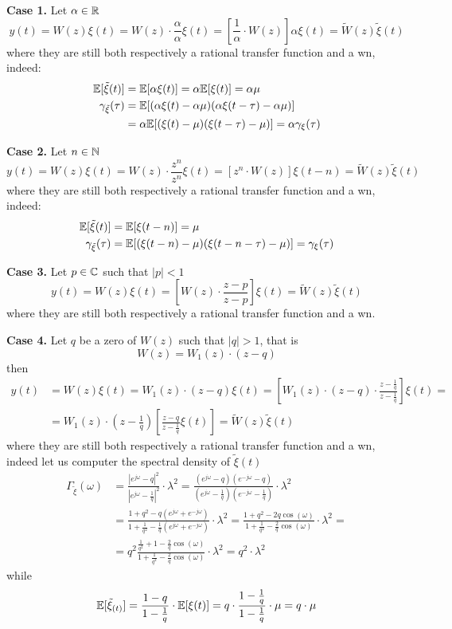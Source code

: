 \textbf{Case 1.}
Let $\alpha \in \mathbb{R}$
\[
	y(t)=W(z) \xi(t)=W(z) \cdot \frac{\alpha}{\alpha} \xi(t)=\left[\frac{1}{\alpha} \cdot W(z)\right] \alpha \xi(t)=\tilde{W}(z) \tilde{\xi}(t)
\]
where they are still both respectively a rational transfer function and a \gls{wn}, indeed:
\begin{align*}
	\mathbb{E}[\tilde{\xi}(t)]&=\mathbb{E}[\alpha \xi(t)]=\alpha \mathbb{E}[\xi(t)]=\alpha \mu\\
	\gamma_{\tilde{\xi}}(\tau)&=\mathbb{E}[(\alpha\xi(t)-\alpha\mu)(\alpha \xi(t-\tau)-\alpha \mu)]\\
	&=\alpha \mathbb{E}[(\xi(t)-\mu)( \xi(t-\tau)- \mu)] = \alpha \gamma_{\xi}(\tau)
\end{align*}

\textbf{Case 2.}
Let $n \in \mathbb{N}$
\[
	y(t)=W(z) \xi(t)=W(z) \cdot \frac{z^{n}}{z^{n}} \xi(t)=\left[z^{n} \cdot W(z)\right] \xi(t-n)=\tilde{W}(z) \tilde{\xi}(t)
\]
where they are still both respectively a rational transfer function and a \gls{wn}, indeed:
\begin{align*}
	\mathbb{E}[\tilde{\xi}(t)]&=\mathbb{E}[\xi(t-n)]=\mu \\
	\gamma_{\tilde{\xi}}(\tau)&=\mathbb{E}[(\xi(t-n)-\mu)(\xi(t-n-\tau)-\mu)]=\gamma_{\xi}(\tau)
\end{align*}

\textbf{Case 3.}
Let $p \in \mathbb{C}$ such that $|p|<1$
\[
	y(t)=W(z) \xi(t)=\left[W(z) \cdot \frac{z-p}{z-p}\right] \xi(t)=\tilde{W}(z) \tilde{\xi}(t)
\]
where they are still both respectively a rational transfer function and a \gls{wn}.

\textbf{Case 4.}
Let $q$ be a zero of $W(z)$ such that $|q|>1$, that is
\[
	W(z)=W_{1}(z)⋅(z-q)
\]
then
\begin{align*}
	y(t)&=W(z) \xi(t)=W_{1}(z) \cdot(z-q) \xi(t)=\left[W_{1}(z) \cdot(z-q) \cdot \frac{z-\frac{1}{q}}{z-\frac{1}{q}}\right] \xi(t)= \\
	&=W_{1}(z) \cdot\left(z-\frac{1}{q}\right)\left[\frac{z-q}{z-\frac{1}{q}} \xi(t)\right]=\tilde{W}(z) \tilde{\xi}(t)
\end{align*}
where they are still both respectively a rational transfer function and a \gls{wn}, indeed let us computer the spectral density of $\tilde{\xi}(t)$
\begin{align*}
	\Gamma_{\tilde\xi}(\omega) &=\frac{\left|e^{j \omega}-q\right|^{2}}{\left|e^{j \omega}-\frac{1}{q}\right|^{2}} \cdot \lambda^{2}=\frac{\left(e^{j \omega}-q\right)\left(e^{-j \omega}-q\right)}{\left(e^{j \omega}-\frac{1}{q}\right)\left(e^{-j \omega}-\frac{1}{q}\right)} \cdot \lambda^{2}\\
	&=\frac{1+q^{2}-q\left(e^{j \omega}+e^{-j \omega}\right)}{1+\frac{1}{q^{2}}-\frac{1}{q}\left(e^{j \omega}+e^{-j \omega}\right)} \cdot \lambda^{2}=\frac{1+q^{2}-2 q \cos (\omega)}{1+\frac{1}{q^{2}}-\frac{2}{q} \cos (\omega)} \cdot \lambda^{2}=\\
	&=q^{2} \frac{\frac{1}{q^{2}}+1-\frac{2}{q} \cos (\omega)}{1+\frac{1}{q^{2}}-\frac{2}{q} \cos (\omega)} \cdot \lambda^{2}=q^{2} \cdot \lambda^{2}
\end{align*}
while
\[
	\mathbb{E}[\tilde{\xi}_{(t)}]=\frac{1-q}{1-\frac{1}{q}} \cdot \mathbb{E}[\xi(t)]=q \cdot \frac{1-\frac{1}{q}}{1-\frac{1}{q}} \cdot \mu=q \cdot \mu
\]